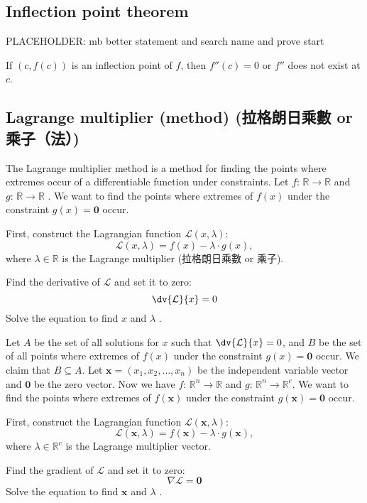 \documentclass[a4paper,12pt]{report}
\begin{document}
\begin{itemize}
\begin{itemize}
\subsection{Inflection point theorem}
PLACEHOLDER: mb better statement and search name and prove start

If $(c,f(c))$ is an inflection point of $f$, then $f''(c)=0$ or $f''$ does not exist at $c$.
\subsection{Lagrange multiplier (method) (拉格朗日乘數 or 乘子（法）)}
The Lagrange multiplier method is a method for finding the points where extremes occur of a differentiable function under constraints.
Let $f:\,\mathbb{R} \rightarrow \mathbb{R}$ and $g:\,\mathbb{R} \rightarrow \mathbb{R}$ . We want to find the points where extremes of \( f(x) \) under the constraint \( g(x) = \mathbf{0} \) occur. 

First, construct the Lagrangian function \( \mathcal{L}(x,\lambda) \):
\[\mathcal{L}(x,\lambda) = f(x) - \lambda \cdot g(x),\]
where \( \lambda\in\mathbb{R} \) is the Lagrange multiplier (拉格朗日乘數 or 乘子).

Find the derivative of $\mathcal{L}$ and set it to zero:
\[
\dv{\mathcal{L}}{x} = 0
\]
Solve the equation to find \( x \) and \( \lambda \) . 

 Let $A$ be the set of all solutions for \( x \) such that $\dv{\mathcal{L}}{x} = 0$, and $B$ be the set of all points where extremes of \( f(x) \) under the constraint \( g(x) = \mathbf{0} \) occur. We claim that $B\subseteq A$.
Let \( \mathbf{x} = (x_1, x_2, \dots, x_n) \) be the independent variable vector and $\mathbf{0}$ be the zero vector. Now we have $f:\,\mathbb{R}^n \rightarrow \mathbb{R}$ and $g:\,\mathbb{R}^n \rightarrow \mathbb{R}^c$. We want to find the points where extremes of \( f(\mathbf{x}) \) under the constraint \( g(\mathbf{x}) = \mathbf{0}\) occur. 

First, construct the Lagrangian function \( \mathcal{L}(\mathbf{x},\lambda) \):
\[
\mathcal{L}(\mathbf{x},\lambda) = f(\mathbf{x}) - \lambda \cdot g(\mathbf{x}),
\]
where \( \lambda\in\mathbb{R}^c \) is the Lagrange multiplier vector.

Find the gradient of $\mathcal{L}$ and set it to zero:
\[
\nabla \mathcal{L} = \mathbf{0}
\]
Solve the equation to find \( \mathbf{x} \) and \( \lambda \) . 


\end{itemize}
\end{itemize}
\end{document}
